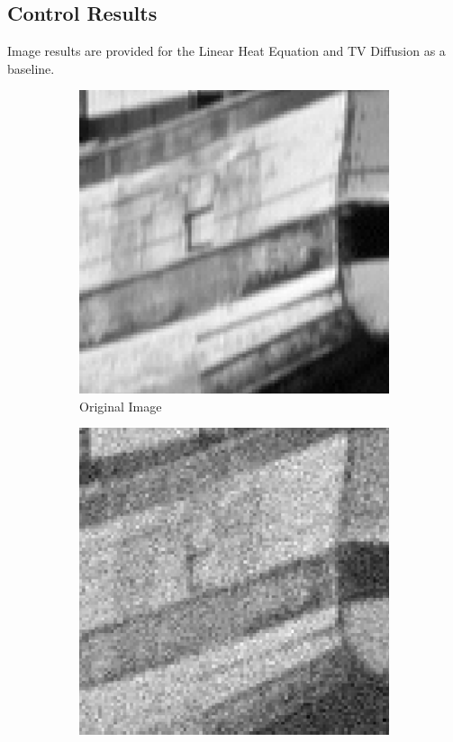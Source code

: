 \documentclass{article}
\begin{document}
  \subsection{Control Results}
  Image results are provided for the Linear Heat Equation and TV Diffusion as a baseline.

  \begin{figure}[!htb]
    \begin{center}
      \begin{subfigure}[b]{0.4\textwidth}
        \includegraphics[width=\textwidth]{../report_images/boat_crop.png}
        \caption{Original Image}
      \end{subfigure}
      \hfill
      \begin{subfigure}[b]{0.4\textwidth}
        \includegraphics[width=\textwidth]{../report_images/noisy.png}

\end{subfigure}
\end{center}
\end{figure}
\end{document}
